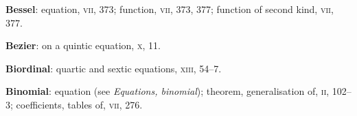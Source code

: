 \documentclass[11pt,a4paper]{book}
\begin{document}
\vspace{0.4em}
\textbf{Bessel}: equation, \textsc{vii}, 373; function, \textsc{vii}, 373, 377; function of second kind, \textsc{vii}, 377.

\vspace{0.4em}
\textbf{Bezier}: on a quintic equation, \textsc{x}, 11.

\vspace{0.4em}
\textbf{Biordinal}: quartic and sextic equations, \textsc{xiii}, 54--7.

\vspace{0.4em}
\textbf{Binomial}: equation (see \textit{Equations, binomial}); theorem, generalisation of, \textsc{ii}, 102--3; coefficients, tables of, \textsc{vii}, 276.
\end{document}
